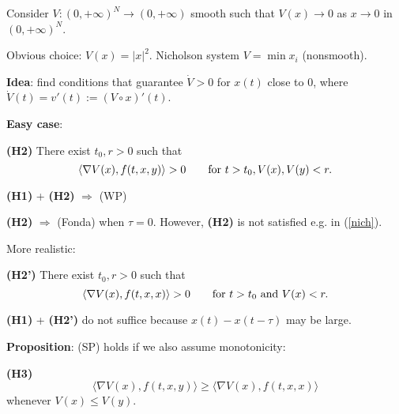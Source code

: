 \documentclass{beamer}
\begin{document}
\begin{frame}{}

 
Consider 
$V:(0,+\infty)^N\to (0,+\infty)$ smooth such that 
$V(x)\to 0$ as $x\to 0$ in $(0,+\infty)^N$. 
\medskip 

Obvious choice: $V(x)= |x|^2$. Nicholson system $V=\min x_i$ (nonsmooth). 

\pause 
\smallskip{}

{\bf Idea}: find conditions that guarantee
 $\dot V>0$ for $x(t)$ close to $0$, where $\dot V(t)=v'(t):=(V\circ x)'(t)$. 


\pause 
\medskip 
{\bf Easy case}: 
\smallskip

{\bf (H2)} There exist $t_0,r>0$ such that
$$ \langle \nabla V(x),f(t,x,y)\rangle >0 \qquad \hbox{for } t>t_0,  V(x),V(y)<r.$$
  
\begin{center}
    {\bf (H1)} + {\bf (H2)} $\Longrightarrow$ (WP)
\end{center}

\smallskip{
}

{\bf (H2)} $\Longrightarrow$ (Fonda) when $\tau=0$. 
However,  {\bf (H2)} is not satisfied e.g. in (\ref{nich}).    
    
\end{frame}


\begin{frame}{}

More realistic: 
\smallskip 

{\bf (H2')} 
There exist $t_0,r>0$ such that
$$ \langle \nabla V(x),f(t,x,x)\rangle >0 \qquad \hbox{for } t>t_0\hbox{ and } V(x)<r.$$

\medskip 

{\bf (H1)}  + {\bf (H2')} do not suffice because 
$x(t)-x(t-\tau)$ may be large. 

\medskip 

{\bf Proposition}:
(SP) holds if we also assume monotonicity:

\medskip


{\bf (H3)} 
$$\langle \nabla V(x),f(t,x,y)\rangle \ge \langle \nabla V(x),f(t,x,x)\rangle$$
whenever $V(x)\le V(y)$. 



\end{frame}
\end{document}
